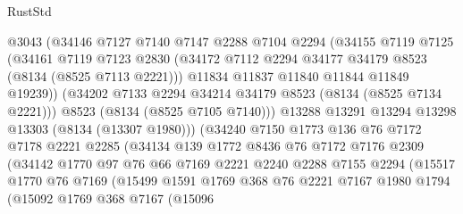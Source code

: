 \begin{lexlean}{RustStd}
\begin{coremodule}
                      @3043
                      (@34146
                        @7127
                        @7140
                        @7147
                        @2288
                        @7104
                        @2294
                        (@34155
                          @7119
                          @7125
                          (@34161
                            @7119
                            @7123
                            @2830
                            (@34172 @7112 @2294 @34177 @34179 @8523 (@8134 (@8525 @7113 @2221)))
                            @11834
                            @11837
                            @11840
                            @11844
                            @11849
                            @19239))
                        (@34202 @7133 @2294 @34214 @34179 @8523 (@8134 (@8525 @7134 @2221)))
                        @8523
                        (@8134 (@8525 @7105 @7140)))
                      @13288
                      @13291
                      @13294
                      @13298
                      @13303
                      (@8134 (@13307 @1980)))
                    (@34240
                      @7150
                      @1773
                      @136
                      @76
                      @7172
                      @7178
                      @2221
                      @2285
                      (@34134
                        @139
                        @1772
                        @8436
                        @76
                        @7172
                        @7176
                        @2309
                        (@34142
                          @1770
                          @97
                          @76
                          @66
                          @7169
                          @2221
                          @2240
                          @2288
                          @7155
                          @2294
                          (@15517
                            @1770
                            @76
                            @7169
                            (@15499
                              @1591
                              @1769
                              @368
                              @76
                              @2221
                              @7167
                              @1980
                              @1794
                              (@15092
                                @1769
                                @368
                                @7167
                                (@15096

\end{coremodule}
\end{lexlean}
